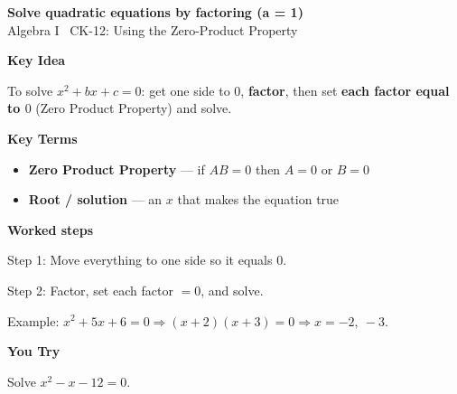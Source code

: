 \documentclass[12pt]{article}
\begin{document}
\begin{center}{\Large \textbf{Solve quadratic equations by factoring (a = 1)}}\\[2pt]{\small Algebra I \textbar\ CK-12: Using the Zero-Product Property}\end{center}\vspace{0.25cm}

{\large\textbf{Key Idea}}\par\smallskip
To solve $x^2+bx+c=0$: get one side to $0$, \textbf{factor}, then set \textbf{each factor equal to $0$} (Zero Product Property) and solve.\par


{\large\textbf{Key Terms}}\par\smallskip
\begin{itemize}[leftmargin=1.4em]
  \item \textbf{Zero Product Property} — if $AB=0$ then $A=0$ or $B=0$
  \item \textbf{Root / solution} — an $x$ that makes the equation true
\end{itemize}


{\large\textbf{Worked steps}}\par\smallskip
Step 1: Move everything to one side so it equals $0$.\par
Step 2: Factor, set each factor $=0$, and solve.\par
Example: $x^2+5x+6=0\Rightarrow(x+2)(x+3)=0\Rightarrow x=-2,\ -3$.\par


{\large\textbf{You Try}}\par\smallskip
Solve $x^2-x-12=0$.\par
\end{document}
